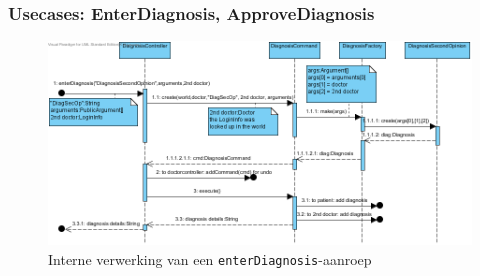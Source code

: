 \documentclass[a4paper]{article}
\begin{document}
\subsubsection{Usecases: EnterDiagnosis, ApproveDiagnosis}
\begin{figure}[h]
\centering
\includegraphics[width=\textwidth]{Pictures/EnterDiagnosis}
\caption{Interne verwerking van een \texttt{enterDiagnosis}-aanroep}
\label{fig:enterdiagnosis}
\end{figure}
\end{document}
